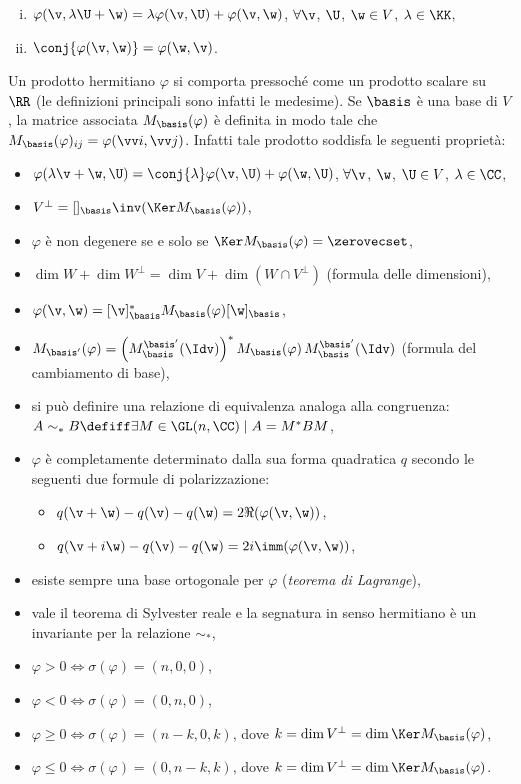 \documentclass[10pt,landscape]{article}
\begin{document}
\begin{multicols}{3}
		\begin{enumerate}[(i)]
			\item $\varphi(\v, \lambda \U + \w) = \lambda \varphi(\v, \U) + \varphi(\v, \w)$,
			$\forall \v$, $\U$, $\w \in V$, $\lambda \in \KK$,
			\item $\conj{\varphi(\v, \w)} = \varphi(\w, \v)$.
		\end{enumerate}
		
		Un prodotto hermitiano $\varphi$ si comporta pressoché come un prodotto
		scalare su $\RR$ (le definizioni principali sono infatti le medesime). Se $\basis$ è una base di $V$, la matrice associata $M_\basis(\varphi)$ è definita in
		modo tale che $M_\basis(\varphi)_{ij} = \varphi(\vv i, \vv j)$. Infatti tale prodotto soddisfa le seguenti proprietà:
		
		\begin{itemize}
			\item $\varphi(\lambda \v + \w, \U) = \conj{\lambda} \varphi(\v, \U) + \varphi(\w, \U)$, $\forall \v$, $\w$, $\U \in V$, $\lambda \in \CC$, 
			\item $V^\perp = []_\basis \inv (\Ker M_\basis(\varphi))$,
			\item $\varphi$ è non degenere se e solo se $\Ker M_\basis(\varphi) = \zerovecset$,
			\item $\dim W + \dim W^\perp = \dim V + \dim (W \cap V^\perp)$ (formula delle dimensioni),
			\item $\varphi(\v, \w) = [\v]_\basis^* M_\basis(\varphi) [\w]_\basis$,
			\item $M_{\basis'}(\varphi) = \left(M_\basis^{\basis'}(\Idv)\right)^* M_\basis(\varphi) \, M_\basis^{\basis'}(\Idv)$ (formula del cambiamento di base),
			\item si può definire una relazione di equivalenza analoga alla congruenza: $A \sim_* B \defiff \exists M \in \GL(n, \CC) \mid A = M^* B M$,
			\item $\varphi$ è completamente determinato dalla sua forma quadratica $q$ secondo le seguenti due formule di polarizzazione:
			\begin{itemize}
				\item $q(\v + \w) - q(\v) - q(\w) = 2 \Re(\varphi(\v, \w))$,
				\item $q(\v + i \w) - q(\v) - q(\w) = 2 i \imm(\varphi(\v, \w))$,
			\end{itemize}
			\item esiste sempre una base ortogonale per $\varphi$ (\textit{teorema di Lagrange}),
			\item vale il teorema di Sylvester reale e la segnatura in senso hermitiano è un invariante per la relazione $\sim_*$,
			\item $\varphi > 0 \iff \sigma(\varphi) = (n, 0, 0)$,
			\item $\varphi < 0 \iff \sigma(\varphi) = (0, n, 0)$,
			\item $\varphi \geq 0 \iff \sigma(\varphi) = (n-k, 0, k)$, dove $k = \dim V^\perp = \dim \Ker M_\basis(\varphi)$,
			\item $\varphi \leq 0 \iff \sigma(\varphi) = (0, n-k, k)$, dove $k = \dim V^\perp = \dim \Ker M_\basis(\varphi)$.
		\end{itemize}
		

\end{multicols}
\end{document}
